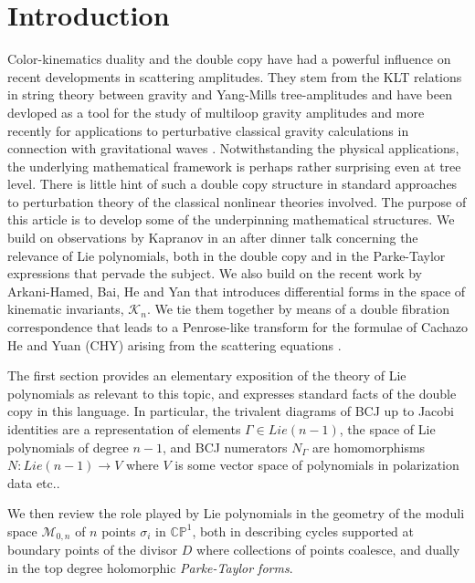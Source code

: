 \documentclass[11pt]{article}
\newcommand{\CP}{\mathbb{CP}}
\newcommand{\cK}{\mathcal{K}}
\newcommand{\cM}{\mathcal{M}}
\newcommand{\1}{{\rm 1\hskip-0.25em I}}
\begin{document}
\section{Introduction}
Color-kinematics duality and the double copy \cite{Bern:2008qj, Bern:2010ue} have had a powerful influence on recent developments in scattering amplitudes. They stem from the KLT relations in string theory \cite{Kawai:1985xq} between gravity and Yang-Mills tree-amplitudes and have been devloped as a  tool for the study of multiloop gravity amplitudes and more recently for applications to perturbative classical gravity calculations in connection with gravitational waves \cite{Bern:2019prr}.  Notwithstanding the physical applications, the underlying mathematical framework is perhaps rather surprising even at tree level.  There is little hint of such a double copy structure in standard approaches to perturbation theory of the classical nonlinear theories involved.
The purpose of this article is to develop some of the underpinning mathematical structures.  We  build on observations by Kapranov in an after dinner talk \cite{Kapranov} concerning the relevance of Lie polynomials, both in the double copy and in the Parke-Taylor expressions that pervade the subject.   We also build on the recent work by Arkani-Hamed, Bai, He and Yan \cite{Arkani-Hamed:2017mur} that introduces differential forms in the space of kinematic invariants, $\cK_n$.
We tie them together by means of a  double fibration correspondence that leads to a Penrose-like transform for the   formulae of Cachazo He and Yuan (CHY)  arising from the scattering equations \cite{Cachazo:2013hca}. 

The first section provides an elementary exposition of the theory of Lie polynomials as relevant to this topic, and  expresses standard facts of the double copy in this language.  In particular, the trivalent diagrams of BCJ up to Jacobi identities are a representation of elements $\Gamma\in Lie(n-1)$, the space of Lie polynomials of degree $n-1$, and BCJ numerators $N_\Gamma$ are homomorphisms $N:Lie(n-1)\rightarrow V$ where $V$ is some vector space of polynomials in polarization data etc..

We then review the role played by Lie polynomials in the geometry of the moduli space $\cM_{0,n}$ of $n$ points $\sigma_i$ in $\CP^1$, both in describing cycles supported at boundary points of the divisor $D$ where collections of points coalesce, and dually in the top degree holomorphic \emph{Parke-Taylor forms}.
\end{document}
